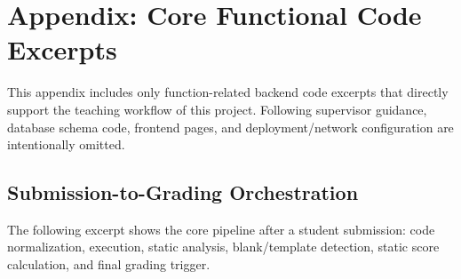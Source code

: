\appendix
\chapter{Appendix: Core Functional Code Excerpts}

This appendix includes only function-related backend code excerpts that directly support the teaching workflow of this project. Following supervisor guidance, database schema code, frontend pages, and deployment/network configuration are intentionally omitted.

\section{Submission-to-Grading Orchestration}
The following excerpt shows the core pipeline after a student submission: code normalization, execution, static analysis, blank/template detection, static score calculation, and final grading trigger.

